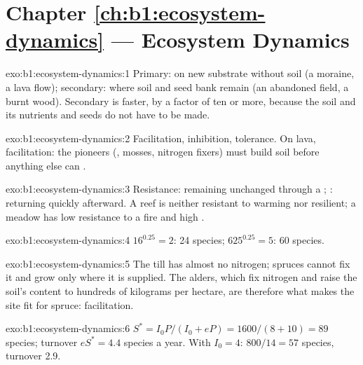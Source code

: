 \section*{Chapter \ref{ch:b1:ecosystem-dynamics} --- Ecosystem Dynamics}

\begin{solution}{exo:b1:ecosystem-dynamics:1}
Primary: on new substrate without soil (a moraine, a lava flow);
secondary: where soil and seed bank remain (an abandoned field, a
burnt wood). Secondary is faster, by a factor of ten or more, because
the soil and its nutrients and seeds do not have to be made.
\end{solution}

\begin{solution}{exo:b1:ecosystem-dynamics:2}
Facilitation, inhibition, tolerance. On lava, facilitation: the
pioneers (, mosses, nitrogen fixers) must build soil before
anything else can .
\end{solution}

\begin{solution}{exo:b1:ecosystem-dynamics:3}
Resistance: remaining unchanged through a ; :
returning quickly afterward. A reef is neither resistant to warming
nor resilient; a meadow has low resistance to a fire and high
.
\end{solution}

\begin{solution}{exo:b1:ecosystem-dynamics:4}
$16^{0.25} = 2$: \num{24} species; $625^{0.25} = 5$: \num{60} species.
\end{solution}

\begin{solution}{exo:b1:ecosystem-dynamics:5}
The till has almost no nitrogen; spruces cannot fix it and grow only
where it is supplied. The alders, which fix nitrogen and raise the
soil's content to hundreds of kilograms per hectare, are therefore
what makes the site fit for spruce: facilitation.
\end{solution}

\begin{solution}{exo:b1:ecosystem-dynamics:6}
$S^* = I_0 P/(I_0 + eP) = 1600/(8 + 10) = 89$ species; turnover
$eS^* = 4.4$ species a year. With $I_0 = 4$: $800/14 = 57$ species,
turnover \num{2.9}.
\end{solution}

